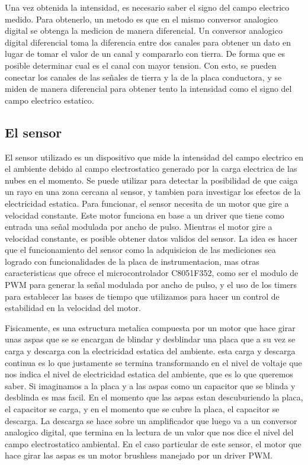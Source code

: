 Una vez obtenida la intensidad, es necesario saber el signo del campo electrico medido. Para obtenerlo, un metodo es que en el mismo conversor analogico digital se obtenga la medicion de manera diferencial. Un conversor analogico digital diferencial toma la diferencia entre dos canales para obtener un dato en lugar de tomar el valor de un canal y compararlo con tierra. De forma que es posible determinar cual es el canal con mayor tension. Con esto, se pueden conectar los canales de las señales de tierra y la de la placa conductora, y se miden de manera diferencial para obtener tento la intensidad como el signo del campo electrico estatico.
\cite{sensorcampo}

\subsection{El sensor} %
\label{sub:el_sensor}

El sensor utilizado es un dispositivo que mide la intensidad del campo electrico en el ambiente debido al campo electrostatico generado por la carga electrica de las nubes en el momento. Se puede utilizar para detectar la posibilidad de que caiga un rayo en una zona cercana al sensor, y tambien para investigar los efectos de la electricidad estatica. Para funcionar, el sensor necesita de un motor que gire a velocidad constante. Este motor funciona en base a un driver que tiene como entrada una señal modulada por ancho de pulso. Mientras el motor gire a velocidad constante, es posible obtener datos validos del sensor. La idea es hacer que el funcionamiento del sensor como la adquisicion de las mediciones sea logrado con funcionalidades de la placa de instrumentacion, mas otras caracteristicas que ofrece el microcontrolador C8051F352, como ser el modulo de PWM para generar la señal modulada por ancho de pulso, y el uso de los timers para establecer las bases de tiempo que utilizamos para hacer un control de estabilidad en la velocidad del motor.

Fisicamente, es una estructura metalica compuesta por un motor que hace girar unas aspas que se se encargan de blindar y desblindar una placa que a su vez se carga y descarga con la electricidad estatica del ambiente. esta carga y descarga continua es lo que justamente se termina transformando en el nivel de voltaje que nos indica el nivel de electricidad estatica del ambiente, que es lo que queremos saber. Si imaginamos a la placa y a las aspas como un capacitor que se blinda y desblinda es mas facil. En el momento que las aspas estan descuburiendo la placa, el capacitor se carga, y en el momento que se cubre la placa, el capacitor se descarga. La descarga se hace sobre un amplificador que luego va a un conversor analogico digital, que termina en la lectura de un valor que nos dice el nivel del campo electrostatico ambiental. En el caso particular de este sensor, el motor que hace girar las aspas es un motor brushless manejado por un driver PWM.

